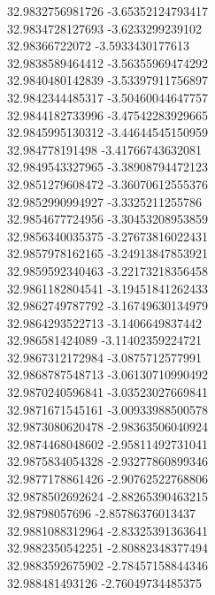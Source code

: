 {32.9832756981726	-3.65352124793417\\
32.9834728127693	-3.6233299239102\\
32.98366722072	-3.5933430177613\\
32.9838589464412	-3.56355969474292\\
32.9840480142839	-3.53397911756897\\
32.9842344485317	-3.50460044647757\\
32.9844182733996	-3.47542283929665\\
32.9845995130312	-3.44644545150959\\
32.984778191498	-3.41766743632081\\
32.9849543327965	-3.38908794472123\\
32.9851279608472	-3.36070612555376\\
32.9852990994927	-3.3325211255786\\
32.9854677724956	-3.30453208953859\\
32.9856340035375	-3.27673816022431\\
32.9857978162165	-3.24913847853921\\
32.9859592340463	-3.22173218356458\\
32.9861182804541	-3.19451841262433\\
32.9862749787792	-3.16749630134979\\
32.9864293522713	-3.1406649837442\\
32.986581424089	-3.11402359224721\\
32.9867312172984	-3.0875712577991\\
32.9868787548713	-3.06130710990492\\
32.9870240596841	-3.03523027669841\\
32.9871671545161	-3.00933988500578\\
32.9873080620478	-2.98363506040924\\
32.9874468048602	-2.95811492731041\\
32.9875834054328	-2.93277860899346\\
32.9877178861426	-2.90762522768806\\
32.9878502692624	-2.88265390463215\\
32.98798057696	-2.85786376013437\\
32.9881088312964	-2.83325391363641\\
32.9882350542251	-2.80882348377494\\
32.9883592675902	-2.78457158844346\\
32.988481493126	-2.76049734485375\\
}
